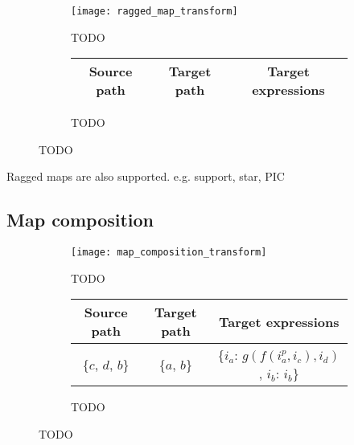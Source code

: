 \documentclass[thesis]{subfiles}
\begin{document}
\begin{figure}[h]
  \centering
  \begin{subfigure}{\textwidth}
    \centering
    \texttt{[image: ragged\_map\_transform]}
    \caption{
      TODO
    }
    \label{fig:ragged_map_transform_flowchart}
  \end{subfigure}

  \vspace{1em}

  \begin{subfigure}{\textwidth}
    \centering
    \begin{tabular}{|c|c|c|}
      \hline
      \textbf{Source path} & \textbf{Target path} & \textbf{Target expressions} \\
      \hline
      \hline
    \end{tabular}
    \caption{
      TODO
    }
    \label{fig:ragged_map_transform_exprs}
  \end{subfigure}

  \caption{
    TODO
  }
  \label{fig:ragged_map_transform}
\end{figure}

Ragged maps are also supported. e.g. support, star, PIC


\subsection{Map composition}

\begin{figure}[h]
  \centering
  \begin{subfigure}{\textwidth}
    \centering
    \texttt{[image: map\_composition\_transform]}
    \caption{
      TODO
    }
    \label{fig:map_composition_transform}
  \end{subfigure}

  \vspace{1em}

  \begin{subfigure}{\textwidth}
    \centering
    \begin{tabular}{|c|c|c|}
      \hline
      \textbf{Source path} & \textbf{Target path} & \textbf{Target expressions} \\
      \hline
      \{$c$, $d$, $b$\} & \{$a$, $b$\} & \{$i_a$: $g(f(i^p_a, i_c), i_d)$, $i_b$: $i_b$\} \\
      \hline
    \end{tabular}
    \caption{
      TODO
    }
    \label{fig:map_composition_transform_exprs}
  \end{subfigure}

  \caption{TODO}
  \label{fig:map_composition_transform_all}
\end{figure}
\end{document}
